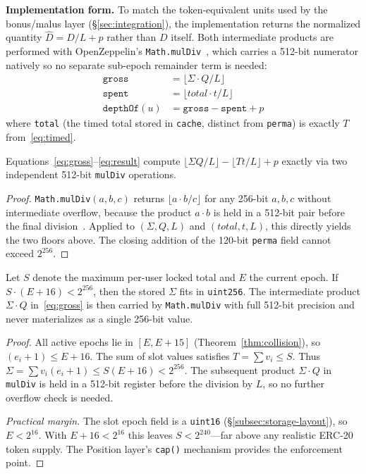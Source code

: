 \documentclass[10pt,a4paper,twocolumn]{article}
\begin{document}
\textbf{Implementation form.} To match the token-equivalent units used by the bonus/malus layer (\S\ref{sec:integration}), the implementation returns the normalized quantity $\widehat{D} = D/L + p$ rather than $D$ itself. Both intermediate products are performed with OpenZeppelin's \texttt{Math.mulDiv}~\cite{oz-math}, which carries a 512-bit numerator natively so no separate sub-epoch remainder term is needed:
\begin{align}
\texttt{gross}    &= \lfloor \Sigma \cdot Q / L \rfloor                 \label{eq:gross} \\
\texttt{spent}    &= \lfloor \mathit{total} \cdot t / L \rfloor          \label{eq:spent} \\
\texttt{depthOf}(u) &= \texttt{gross} - \texttt{spent} + p              \label{eq:result}
\end{align}
where \texttt{total} (the timed total stored in \texttt{cache}, distinct from \texttt{perma}) is exactly $T$ from~\eqref{eq:timed}.

\begin{lemma}
\label{lem:overflow}
Equations~\eqref{eq:gross}--\eqref{eq:result} compute $\lfloor \Sigma Q/L \rfloor - \lfloor T t/L \rfloor + p$ exactly via two independent 512-bit \texttt{mulDiv} operations.
\end{lemma}

\begin{proof}
\texttt{Math.mulDiv}$(a,b,c)$ returns $\lfloor a\cdot b / c \rfloor$ for any 256-bit $a,b,c$ without intermediate overflow, because the product $a\cdot b$ is held in a 512-bit pair before the final division~\cite{oz-math}. Applied to $(\Sigma, Q, L)$ and $(\mathit{total}, t, L)$, this directly yields the two floors above. The closing addition of the 120-bit \texttt{perma} field cannot exceed $2^{256}$.
\end{proof}

\begin{lemma}
\label{lem:sigma-overflow}
Let $S$ denote the maximum per-user locked total and $E$ the current epoch. If $S \cdot (E{+}16) < 2^{256}$, then the stored $\Sigma$ fits in \texttt{uint256}. The intermediate product $\Sigma \cdot Q$ in~\eqref{eq:gross} is then carried by \texttt{Math.mulDiv} with full 512-bit precision and never materializes as a single 256-bit value.
\end{lemma}

\begin{proof}
All active epochs lie in $[E, E{+}15]$ (Theorem~\ref{thm:collision}), so $(e_i{+}1) \leq E{+}16$. The sum of slot values satisfies $T = \sum v_i \leq S$. Thus $\Sigma = \sum v_i(e_i{+}1) \leq S(E{+}16) < 2^{256}$. The subsequent product $\Sigma\cdot Q$ in \texttt{mulDiv} is held in a 512-bit register before the division by $L$, so no further overflow check is needed.

\emph{Practical margin.} The slot epoch field is a \texttt{uint16} (\S\ref{subsec:storage-layout}), so $E < 2^{16}$. With $E{+}16 < 2^{16}$ this leaves $S < 2^{240}$---far above any realistic ERC-20 token supply. The Position layer's \texttt{cap()} mechanism provides the enforcement point.
\end{proof}
\end{document}
